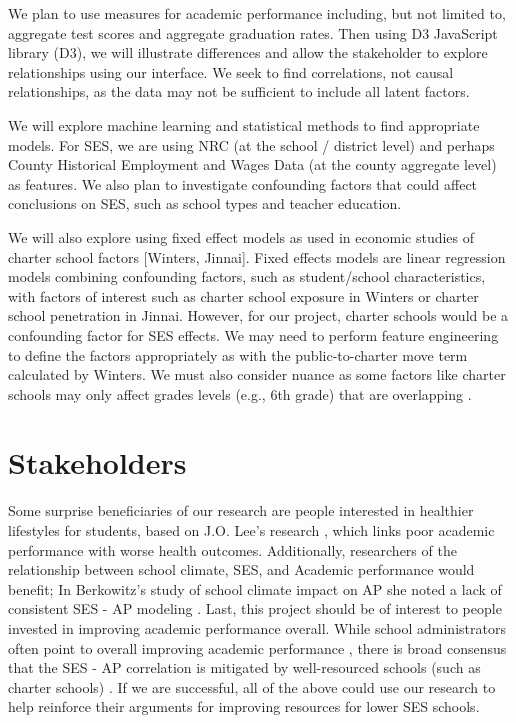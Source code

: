 \documentclass[sigconf,nonacm,11pt]{acmart}
\begin{document}
We plan to use measures for academic performance including, but not limited to, aggregate test scores and aggregate graduation rates.  Then using D3 JavaScript library (D3), we will illustrate differences and allow the stakeholder to explore relationships using our interface. We seek to find correlations, not causal relationships, as the data may not be sufficient to include all latent factors.

We will explore machine learning and statistical methods to find appropriate models.  For SES, we are using NRC (at the school / district level) and perhaps County Historical Employment and Wages Data (at the county aggregate level) as features. We also plan to investigate confounding factors that could affect conclusions on SES, such as school types and teacher education.

We will also explore using fixed effect models as used in economic studies of charter school factors [Winters, Jinnai]. Fixed effects models are linear regression models combining confounding factors, such as student/school characteristics, with factors of interest such as charter school exposure in Winters or charter school penetration in Jinnai. However, for our project, charter schools would be a confounding factor for SES effects. We may need to perform feature engineering to define the factors appropriately as with the public-to-charter move term calculated by Winters. We must also consider nuance as some factors like charter schools may only affect grades levels (e.g., 6th grade) that are overlapping \cite{jinnai}.

\section{Stakeholders}
Some surprise beneficiaries of our research are people interested in healthier lifestyles for students, based on J.O. Lee's research \cite{lee}, which links poor academic performance with worse health outcomes. Additionally, researchers of the relationship between school climate, SES, and Academic performance would benefit; In Berkowitz's study of school climate impact on AP she noted a lack of consistent SES - AP modeling \cite{berkowitz}. Last, this project should be of interest to people invested in improving academic performance overall. While school administrators often point to overall improving academic performance \cite{domanico}, there is broad consensus that the SES - AP correlation is mitigated by well-resourced schools (such as charter schools) \cite{domanico, jinnai}. If we are successful, all of the above could use our research to help reinforce their arguments for improving resources for lower SES schools.
\end{document}
